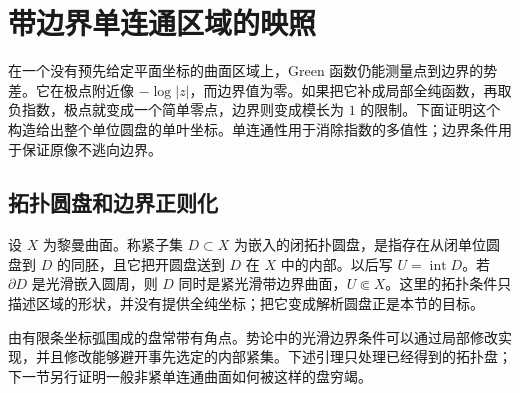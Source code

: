 
% 
% 

\section{带边界单连通区域的映照}
\label{g4:sec:0502}

在一个没有预先给定平面坐标的曲面区域上，Green 函数仍能测量点到边界的势差。它在极点附近像 \(-\log|z|\)，而边界值为零。如果把它补成局部全纯函数，再取负指数，极点就变成一个简单零点，边界则变成模长为 \(1\) 的限制。下面证明这个构造给出整个单位圆盘的单叶坐标。单连通性用于消除指数的多值性；边界条件用于保证原像不逃向边界。

\subsection{拓扑圆盘和边界正则化}
\label{g4:subsec:0502:01}

设 \(X\) 为黎曼曲面。称紧子集 \(D\subset X\) 为嵌入的闭拓扑圆盘，是指存在从闭单位圆盘到 \(D\) 的同胚，且它把开圆盘送到 \(D\) 在 \(X\) 中的内部。以后写 \(U=\operatorname{int}D\)。若 \(\partial D\) 是光滑嵌入圆周，则 \(D\) 同时是紧光滑带边界曲面，\(U\Subset X\)。这里的拓扑条件只描述区域的形状，并没有提供全纯坐标；把它变成解析圆盘正是本节的目标。

\ProseParagraphBreak

由有限条坐标弧围成的盘常带有角点。势论中的光滑边界条件可以通过局部修改实现，并且修改能够避开事先选定的内部紧集。下述引理只处理已经得到的拓扑盘；下一节另行证明一般非紧单连通曲面如何被这样的盘穷竭。

